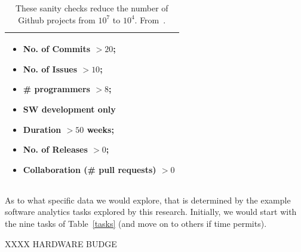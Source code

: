 
\begin{table}
{\small
\begin{tabular}{|p{2.1in}|}\hline 
\rowcolor{blue!10}\begin{itemize}[leftmargin=*]
\item
No. of Commits $> 20$;
\item
No. of Issues $> 10$;
\item
\# programmers $> 8$;
\item
SW development only 
\item Duration $> 50$ weeks;
\item
No. of Releases $> 0$; 
\item
Collaboration (\# pull requests) $> 0$
\end{itemize} \\\hline
\end{tabular}}
\caption{These sanity checks  reduce the number of
Github projects from $10^7$ to $10^4$.
From~\cite{5069475,Kalliamvakou2014,Munaiah2017}.}\label{tbl:sanity}
\end{table} As to what specific data we would explore, that is determined by the example software analytics tasks 
explored by this research.  Initially, we would start with the nine tasks  of Table~\ref{tasks} (and move on to others if time permits).

XXXX HARDWARE BUDGE


